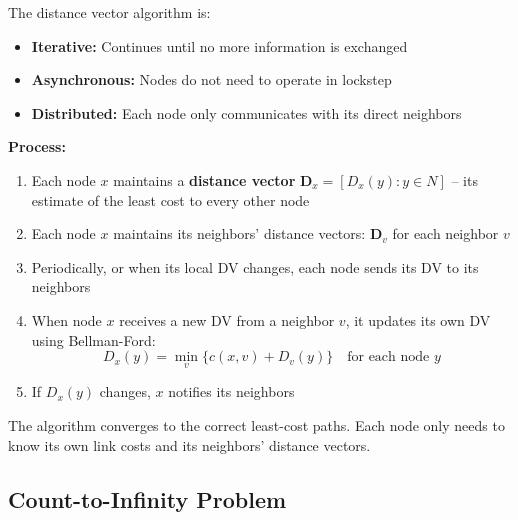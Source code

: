 \begin{keybox}
The distance vector algorithm is:
\begin{itemize}[noitemsep]
    \item \textbf{Iterative:} Continues until no more information is exchanged
    \item \textbf{Asynchronous:} Nodes do not need to operate in lockstep
    \item \textbf{Distributed:} Each node only communicates with its direct neighbors
\end{itemize}

\textbf{Process:}
\begin{enumerate}[noitemsep]
    \item Each node $x$ maintains a \textbf{distance vector} $\mathbf{D}_x = [D_x(y) : y \in N]$ -- its estimate of the least cost to every other node
    \item Each node $x$ maintains its neighbors' distance vectors: $\mathbf{D}_v$ for each neighbor $v$
    \item Periodically, or when its local DV changes, each node sends its DV to its neighbors
    \item When node $x$ receives a new DV from a neighbor $v$, it updates its own DV using Bellman-Ford:
    \[
    D_x(y) = \min_v \big\{ c(x,v) + D_v(y) \big\} \quad \text{for each node } y
    \]
    \item If $D_x(y)$ changes, $x$ notifies its neighbors
\end{enumerate}

The algorithm converges to the correct least-cost paths. Each node only needs to know its own link costs and its neighbors' distance vectors.
\end{keybox}

\begin{imagebox}
\end{imagebox}

\subsection{Count-to-Infinity Problem}

